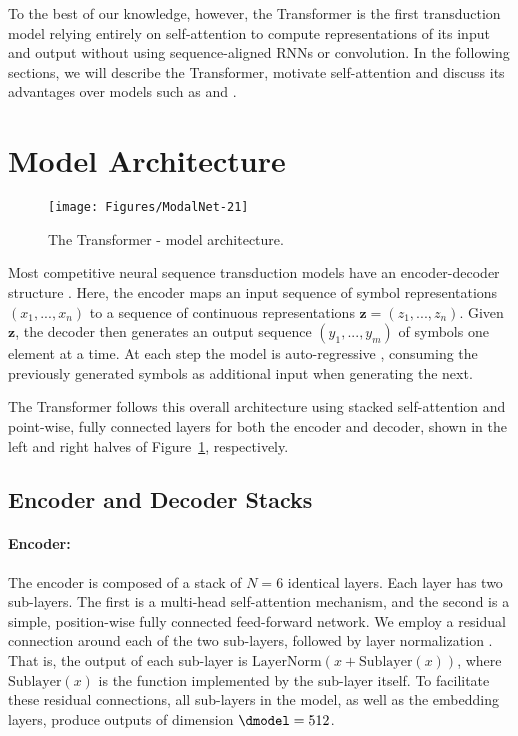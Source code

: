 To the best of our knowledge, however, the Transformer is the first transduction model relying entirely on self-attention to compute representations of its input and output without using sequence-aligned RNNs or convolution.
In the following sections, we will describe the Transformer, motivate self-attention and discuss its advantages over models such as \citep{neural_gpu, NalBytenet2017} and \citep{JonasFaceNet2017}.


\section{Model Architecture}

\begin{figure}
    \centering
    \texttt{[image: Figures/ModalNet-21]}
    \caption{The Transformer - model architecture.}
    \label{fig:model-arch}
  \end{figure}
  
  
  Most competitive neural sequence transduction models have an encoder-decoder structure \citep{cho2014learning,bahdanau2014neural,sutskever14}. Here, the encoder maps an input sequence of symbol representations $(x_1, ..., x_n)$ to a sequence of continuous representations $\mathbf{z} = (z_1, ..., z_n)$. Given $\mathbf{z}$, the decoder then generates an output sequence $(y_1,...,y_m)$ of symbols one element at a time. At each step the model is auto-regressive \citep{graves2013generating}, consuming the previously generated symbols as additional input when generating the next.
  
  The Transformer follows this overall architecture using stacked self-attention and point-wise, fully connected layers for both the encoder and decoder, shown in the left and right halves of Figure~\ref{fig:model-arch}, respectively.
  
  \subsection{Encoder and Decoder Stacks}
  
  \paragraph{Encoder:}The encoder is composed of a stack of $N=6$ identical layers. Each layer has two sub-layers. The first is a multi-head self-attention mechanism, and the second is a simple, position-wise fully connected feed-forward network.   We employ a residual connection \citep{he2016deep} around each of the two sub-layers, followed by layer normalization \cite{layernorm2016}.  That is, the output of each sub-layer is $\mathrm{LayerNorm}(x + \mathrm{Sublayer}(x))$, where $\mathrm{Sublayer}(x)$ is the function implemented by the sub-layer itself.  To facilitate these residual connections, all sub-layers in the model, as well as the embedding layers, produce outputs of dimension $\dmodel=512$.
  
